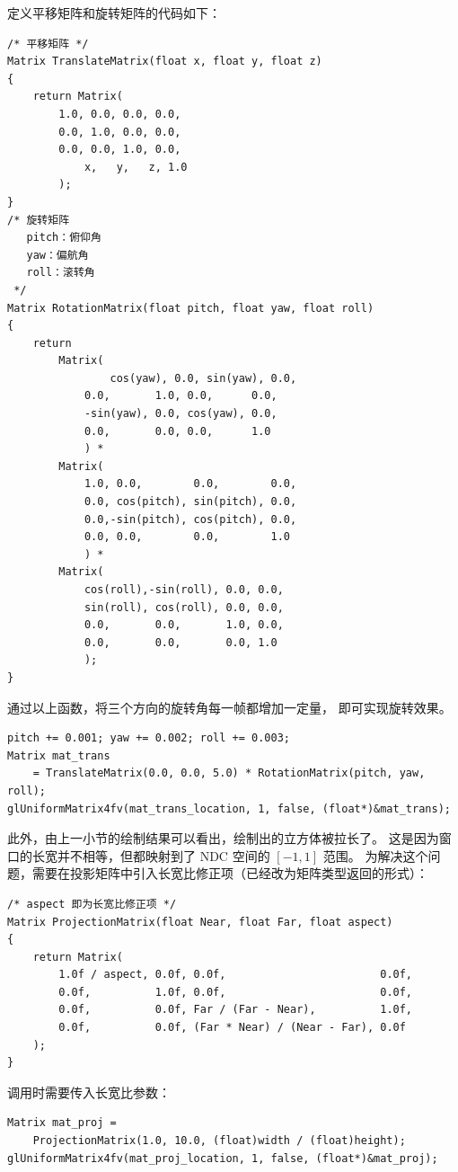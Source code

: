 \documentclass[fontset=windows]{ctexart}
\begin{document}
定义平移矩阵和旋转矩阵的代码如下：
\begin{lstlisting}
/* 平移矩阵 */
Matrix TranslateMatrix(float x, float y, float z)
{
    return Matrix(
        1.0, 0.0, 0.0, 0.0,
        0.0, 1.0, 0.0, 0.0,
        0.0, 0.0, 1.0, 0.0,
            x,   y,   z, 1.0
        );
}
/* 旋转矩阵
   pitch：俯仰角
   yaw：偏航角
   roll：滚转角
 */
Matrix RotationMatrix(float pitch, float yaw, float roll)
{
    return
        Matrix(
                cos(yaw), 0.0, sin(yaw), 0.0,
            0.0,       1.0, 0.0,      0.0,
            -sin(yaw), 0.0, cos(yaw), 0.0,
            0.0,       0.0, 0.0,      1.0
            ) *
        Matrix(
            1.0, 0.0,        0.0,        0.0,
            0.0, cos(pitch), sin(pitch), 0.0,
            0.0,-sin(pitch), cos(pitch), 0.0,
            0.0, 0.0,        0.0,        1.0
            ) *
        Matrix(
            cos(roll),-sin(roll), 0.0, 0.0,
            sin(roll), cos(roll), 0.0, 0.0,
            0.0,       0.0,       1.0, 0.0,
            0.0,       0.0,       0.0, 1.0
            );
}
\end{lstlisting}

通过以上函数，将三个方向的旋转角每一帧都增加一定量，
即可实现旋转效果。

\begin{lstlisting}
pitch += 0.001; yaw += 0.002; roll += 0.003;
Matrix mat_trans
    = TranslateMatrix(0.0, 0.0, 5.0) * RotationMatrix(pitch, yaw, roll);
glUniformMatrix4fv(mat_trans_location, 1, false, (float*)&mat_trans);
\end{lstlisting}

此外，由上一小节的绘制结果可以看出，绘制出的立方体被拉长了。
这是因为窗口的长宽并不相等，但都映射到了 NDC 空间的 $[-1, 1]$ 范围。
为解决这个问题，需要在投影矩阵中引入长宽比修正项（已经改为矩阵类型返回的形式）：

\begin{lstlisting}
/* aspect 即为长宽比修正项 */
Matrix ProjectionMatrix(float Near, float Far, float aspect)
{
    return Matrix(
        1.0f / aspect, 0.0f, 0.0f,                        0.0f,
        0.0f,          1.0f, 0.0f,                        0.0f,
        0.0f,          0.0f, Far / (Far - Near),          1.0f,
        0.0f,          0.0f, (Far * Near) / (Near - Far), 0.0f
    );
}
\end{lstlisting}

调用时需要传入长宽比参数：
\begin{lstlisting}
Matrix mat_proj = 
    ProjectionMatrix(1.0, 10.0, (float)width / (float)height);
glUniformMatrix4fv(mat_proj_location, 1, false, (float*)&mat_proj);
\end{lstlisting}
\end{document}
